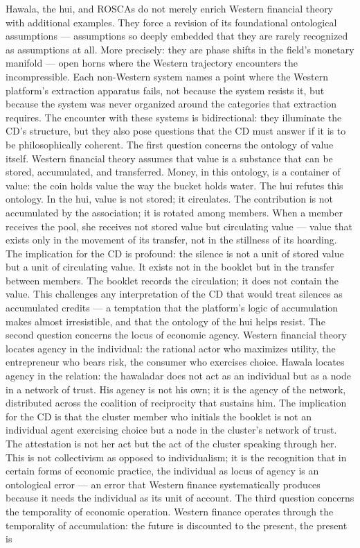 Hawala, the hui, and ROSCAs do not merely enrich Western financial theory with additional examples. They force a revision of its foundational ontological assumptions — assumptions so deeply embedded that they are rarely recognized as assumptions at all. More precisely: they are phase shifts in the field’s monetary manifold — open horns where the Western trajectory encounters the incompressible. Each non-Western system names a point where the Western platform’s extraction apparatus fails, not because the system resists it, but because the system was never organized around the categories that extraction requires. The encounter with these systems is bidirectional: they illuminate the CD’s structure, but they also pose questions that the CD must answer if it is to be philosophically coherent. The first question concerns the ontology of value itself. Western financial theory assumes that value is a substance that can be stored, accumulated, and transferred. Money, in this ontology, is a container of value: the coin holds value the way the bucket holds water. The hui refutes this ontology. In the hui, value is not stored; it circulates. The contribution is not accumulated by the association; it is rotated among members. When a member receives the pool, she receives not stored value but circulating value — value that exists only in the movement of its transfer, not in the stillness of its hoarding. The implication for the CD is profound: the silence is not a unit of stored value but a unit of circulating value. It exists not in the booklet but in the transfer between members. The booklet records the circulation; it does not contain the value. This challenges any interpretation of the CD that would treat silences as accumulated credits — a temptation that the platform’s logic of accumulation makes almost irresistible, and that the ontology of the hui helps resist. The second question concerns the locus of economic agency. Western financial theory locates agency in the individual: the rational actor who maximizes utility, the entrepreneur who bears risk, the consumer who exercises choice. Hawala locates agency in the relation: the hawaladar does not act as an individual but as a node in a network of trust. His agency is not his own; it is the agency of the network, distributed across the coalition of reciprocity that sustains him. The implication for the CD is that the cluster member who initials the booklet is not an individual agent exercising choice but a node in the cluster’s network of trust. The attestation is not her act but the act of the cluster speaking through her. This is not collectivism as opposed to individualism; it is the recognition that in certain forms of economic practice, the individual as locus of agency is an ontological error — an error that Western finance systematically produces because it needs the individual as its unit of account. The third question concerns the temporality of economic operation. Western finance operates through the temporality of accumulation: the future is discounted to the present, the present is

